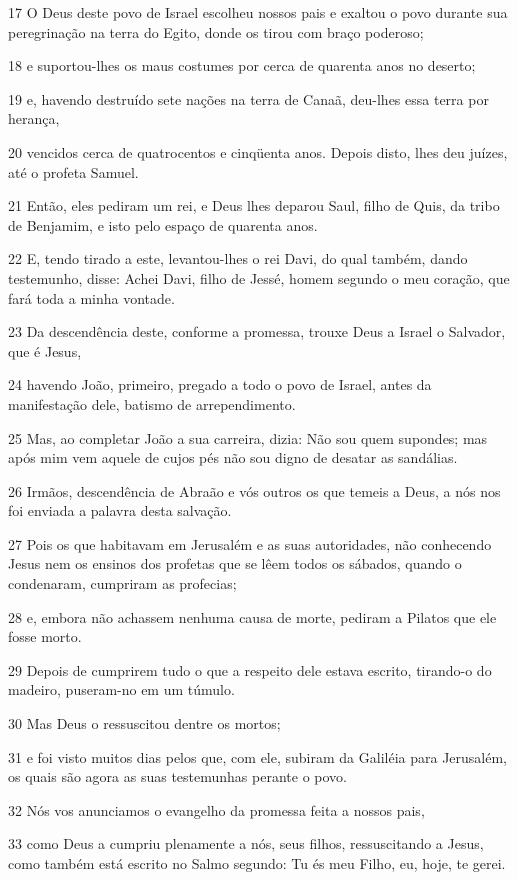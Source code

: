 \par 17 O Deus deste povo de Israel escolheu nossos pais e exaltou o povo durante sua peregrinação na terra do Egito, donde os tirou com braço poderoso;
\par 18 e suportou-lhes os maus costumes por cerca de quarenta anos no deserto;
\par 19 e, havendo destruído sete nações na terra de Canaã, deu-lhes essa terra por herança,
\par 20 vencidos cerca de quatrocentos e cinqüenta anos. Depois disto, lhes deu juízes, até o profeta Samuel.
\par 21 Então, eles pediram um rei, e Deus lhes deparou Saul, filho de Quis, da tribo de Benjamim, e isto pelo espaço de quarenta anos.
\par 22 E, tendo tirado a este, levantou-lhes o rei Davi, do qual também, dando testemunho, disse: Achei Davi, filho de Jessé, homem segundo o meu coração, que fará toda a minha vontade.
\par 23 Da descendência deste, conforme a promessa, trouxe Deus a Israel o Salvador, que é Jesus,
\par 24 havendo João, primeiro, pregado a todo o povo de Israel, antes da manifestação dele, batismo de arrependimento.
\par 25 Mas, ao completar João a sua carreira, dizia: Não sou quem supondes; mas após mim vem aquele de cujos pés não sou digno de desatar as sandálias.
\par 26 Irmãos, descendência de Abraão e vós outros os que temeis a Deus, a nós nos foi enviada a palavra desta salvação.
\par 27 Pois os que habitavam em Jerusalém e as suas autoridades, não conhecendo Jesus nem os ensinos dos profetas que se lêem todos os sábados, quando o condenaram, cumpriram as profecias;
\par 28 e, embora não achassem nenhuma causa de morte, pediram a Pilatos que ele fosse morto.
\par 29 Depois de cumprirem tudo o que a respeito dele estava escrito, tirando-o do madeiro, puseram-no em um túmulo.
\par 30 Mas Deus o ressuscitou dentre os mortos;
\par 31 e foi visto muitos dias pelos que, com ele, subiram da Galiléia para Jerusalém, os quais são agora as suas testemunhas perante o povo.
\par 32 Nós vos anunciamos o evangelho da promessa feita a nossos pais,
\par 33 como Deus a cumpriu plenamente a nós, seus filhos, ressuscitando a Jesus, como também está escrito no Salmo segundo: Tu és meu Filho, eu, hoje, te gerei.
